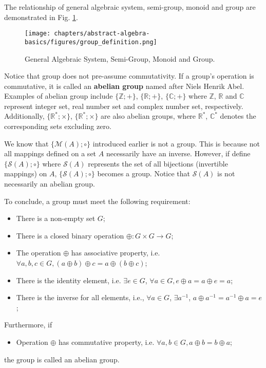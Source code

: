 The relationship of general algebraic system, semi-group, monoid and group are demonstrated in Fig. \ref{fig:group_definition}.
\begin{figure}[htbp]
	\centering
	\texttt{[image: chapters/abstract-algebra-basics/figures/group\_definition.png]}
	\caption{General Algebraic System, Semi-Group, Monoid and Group.} \label{fig:group_definition}
\end{figure}

Notice that group does not pre-assume commutativity. If a group's operation is commutative, it is called an \textbf{abelian group} named after Niels Henrik Abel. Examples of abelian group include $\{\mathbb{Z}; +\}$, $\{\mathbb{R}; +\}$, $\{\mathbb{C}; +\}$ where $\mathbb{Z}$, $\mathbb{R}$ and $\mathbb{C}$ represent integer set, real number set and complex number set, respectively. Additionally, $\{\mathbb{R}^{*}; \times \}$, $\{\mathbb{R}^{*}; \times \}$ are also abelian groups, where $\mathbb{R}^*$,  $\mathbb{C}^*$ denotes the corresponding sets excluding zero.

We know that $\{\mathcal{M}(A); \circ\}$ introduced earlier is not a group. This is because not all mappings defined on a set $A$ necessarily have an inverse. However, if define $\{\mathcal{S}(A); \circ\}$ where $\mathcal{S}(A)$ represents the set of all  bijections (invertible mappings) on $A$, $\{\mathcal{S}(A); \circ\}$ becomes a group. Notice that $\mathcal{S}(A)$ is not necessarily an abelian group.

To conclude, a group must meet the following requirement:
\begin{itemize}
	\item There is a non-empty set $G$;
	\item There is a closed binary operation $\oplus: G\times G \rightarrow G$;
	\item The operation $\oplus$ has associative property, i.e. $\forall a, b, c \in G, (a \oplus b) \oplus c = a\oplus (b \oplus c)$;
	\item There is the identity element, i.e. $\exists e\in G$, $\forall a \in G, e\oplus a = a \oplus e = a$;
	\item There is the inverse for all elements, i.e., $\forall a\in G$, $\exists a^{-1}$, $a\oplus a^{-1} = a^{-1}\oplus a = e$;
\end{itemize}
Furthermore, if
\begin{itemize}
	\item Operation $\oplus$ has commutative property, i.e. $\forall a, b\in G, a\oplus b=b\oplus a$;
\end{itemize}
the group is called an abelian group.

